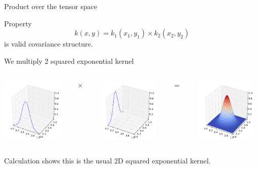 \documentclass{beamer}
\begin{document}
\begin{frame}{Product over the tensor space}
\begin{block}{Property}
\begin{equation*}
k(x,y) = k_1(x_1,y_1) \times k_2(x_2,y_2)
\end{equation*}
is valid covariance structure.
\end{block}
\begin{example}
We multiply 2 squared exponential kernel
\begin{columns}[c]
\begin{column}{3cm}
\includegraphics[width=3cm]{figures/python/newfromold-sum2-k1}
\end{column}
\begin{column}{2mm}
$\times $
\end{column}
\begin{column}{3cm}
\includegraphics[width=3cm]{figures/python/newfromold-sum2-k2}
\end{column}
\begin{column}{2mm}
$=$
\end{column}
\begin{column}{3cm}
\includegraphics[width=3cm]{figures/python/newfromold-prod2-k12}
\end{column}
\end{columns}
\vspace{5mm}
Calculation shows this is the usual 2D squared exponential kernel.
\end{example}
\end{frame}
\end{document}
